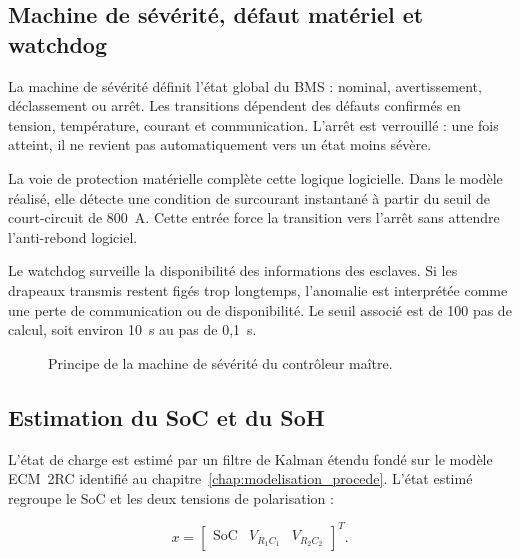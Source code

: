 \subsection{Machine de sévérité, défaut matériel et watchdog}
\label{subsec:ch4_fsm_severite}

La machine de sévérité définit l'état global du BMS : nominal, avertissement, déclassement ou arrêt. Les transitions dépendent des défauts confirmés en tension, température, courant et communication. L'arrêt est verrouillé : une fois atteint, il ne revient pas automatiquement vers un état moins sévère.

\noindent
La voie de protection matérielle complète cette logique logicielle. Dans le modèle réalisé, elle détecte une condition de surcourant instantané à partir du seuil de court-circuit de 800~A. Cette entrée force la transition vers l'arrêt sans attendre l'anti-rebond logiciel.

\noindent
Le watchdog surveille la disponibilité des informations des esclaves. Si les drapeaux transmis restent figés trop longtemps, l'anomalie est interprétée comme une perte de communication ou de disponibilité. Le seuil associé est de 100 pas de calcul, soit environ 10~s au pas de 0{,}1~s.

\begin{figure}[H]
  \centering
  \captionsetup{width=0.80\textwidth, skip=15pt}
  \caption{Principe de la machine de sévérité du contrôleur maître.}
  \label{fig:ch4_fsm_severite}
\end{figure}

\subsection{Estimation du SoC et du SoH}
\label{subsec:ch4_estimation_soc_soh}

L'état de charge est estimé par un filtre de Kalman étendu fondé sur le modèle ECM~2RC identifié au chapitre~\ref{chap:modelisation_procede}. L'état estimé regroupe le SoC et les deux tensions de polarisation :

\begin{equation}
  x =
  \begin{bmatrix}
  \mathrm{SoC} & V_{R_1C_1} & V_{R_2C_2}
  \end{bmatrix}^T .
  \label{eq:ch4_etat_ekf}
\end{equation}

